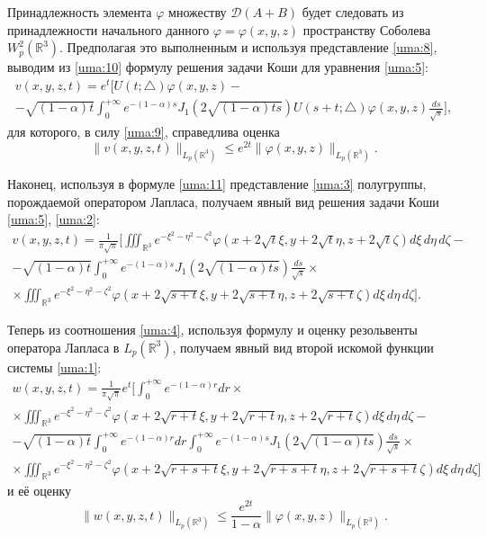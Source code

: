 Принадлежность элемента $\varphi$  множеству  $\mathcal{D}(A+B)$ будет следовать из принадлежности начального данного $\varphi=\varphi(x,y,z)$ пространству Соболева  $W_p^2(\mathbb R^3)$. Предполагая это выполненным и используя представление \eqref{uma:8}, выводим из \eqref{uma:10} формулу решения задачи Коши для уравнения \eqref{uma:5}:
\begin{multline}
v(x,y,z,t)=e^t\Biggl[U(t;\triangle)\varphi(x,y,z)-
\\
-\sqrt{(1-\alpha)t}\int_0^{+\infty}e^{-(1-\alpha)s}J_1\left(2\sqrt{(1-\alpha)ts}\right)U(s+t;\triangle)
\varphi(x,y,z)\frac{ds}{\sqrt{s}}\Biggr],
\label{uma:11}
\end{multline}
для которого, в силу \eqref{uma:9}, справедлива оценка
\begin{equation}
\|v(x,y,z,t)\|_{L_p(\mathbb R^3)}\leq e^{2t}\|\varphi(x,y,z)\|_{L_p(\mathbb R^3)}.
\label{uma:12}
\end{equation}

Наконец, используя в формуле \eqref{uma:11} представление \eqref{uma:3} полугруппы, порождаемой оператором Лапласа, получаем явный вид решения задачи Коши \eqref{uma:5}, \eqref{uma:2}:
\begin{multline}
v(x,y,z,t)=\frac{1}{\pi\sqrt{\pi}}\Biggl[\iiint_{\mathbb R^3}
e^{-\xi^2-\eta^2-\zeta^2}\varphi(x+2\sqrt{t}\xi, y+2\sqrt{t}\eta, z+2\sqrt{t}\zeta)d\xi\,d\eta\,d\zeta-
\\
-\sqrt{(1-\alpha)t}\int_0^{+\infty}e^{-(1-\alpha)s}J_1\left(2\sqrt{(1-\alpha)ts}\right)\frac{ds}{\sqrt{s}}\times
\\
\times\iiint_{\mathbb R^3}e^{-\xi^2-\eta^2-\zeta^2}\varphi(x+2\sqrt{s+t}\xi, y+2\sqrt{s+t}\eta, z+2\sqrt{s+t}\zeta)d\xi\,d\eta\,d\zeta\Biggr].
\label{uma:13}
\end{multline}

Теперь из соотношения \eqref{uma:4}, используя формулу и оценку резольвенты оператора Лапласа в  $L_p(\mathbb R^3)$, получаем явный вид второй искомой функции системы \eqref{uma:1}:
\begin{multline}
w(x,y,z,t)=\frac{1}{\pi\sqrt{\pi}}e^t\Biggl[\int_0^{+\infty}e^{-(1-\alpha)r}dr\times
\\
\times\iiint_{\mathbb R^3}e^{-\xi^2-\eta^2-\zeta^2}\varphi(x+2\sqrt{r+t}\xi, y+2\sqrt{r+t}\eta, z+2\sqrt{r+t}\zeta)d\xi\,d\eta\,d\zeta-
\\
-\sqrt{(1-\alpha)t}\int_0^{+\infty}e^{-(1-\alpha)r}dr\int_0^{+\infty}e^{-(1-\alpha)s}J_1\left(2\sqrt{(1-\alpha)ts}\right)\frac{ds}{\sqrt{s}}\times
\\
\times\iiint_{\mathbb R^3}e^{-\xi^2-\eta^2-\zeta^2}\varphi(x+2\sqrt{r+s+t}\xi, y+2\sqrt{r+s+t}\eta,z+2\sqrt{r+s+t}\zeta)d\xi\,d\eta\,d\zeta\Biggr]
\label{uma:14}
\end{multline}
и её оценку
\begin{equation}
\|w(x,y,z,t)\|_{L_p(\mathbb R^3)}\leq\frac{e^{2t}}{1-\alpha}\|\varphi(x,y,z)\|_{L_p(\mathbb R^3)}.
\label{uma:15}
\end{equation}

